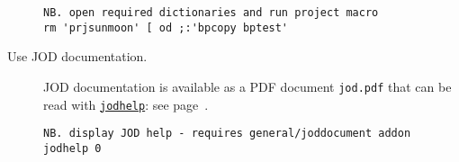 \begin{description}
\begin{lstlisting}[frame=single,framerule=0pt]
NB. open required dictionaries and run project macro
rm 'prjsunmoon' [ od ;:'bpcopy bptest'
\end{lstlisting}
 

\item[Use JOD documentation.] JOD documentation is available as a
PDF document \verb|jod.pdf|
that can be read with \hyperlink{il:jodhelp}{\texttt{jodhelp}}: see page~\pageref{ss:jodhelp}.

\begin{lstlisting}[frame=single,framerule=0pt]
NB. display JOD help - requires general/joddocument addon
jodhelp 0
\end{lstlisting}

\end{description}